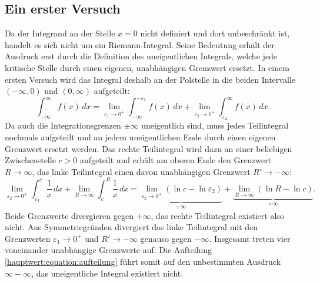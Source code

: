 \subsection{Ein erster Versuch}
Da der Integrand an der Stelle $x = 0$ nicht definiert und dort unbeschränkt
ist, handelt es sich nicht um ein Riemann-Integral.
Seine Bedeutung erhält der Ausdruck erst durch die Definition des
uneigentlichen Integrals, welche jede kritische Stelle durch einen eigenen,
unabhängigen Grenzwert ersetzt.
In einem ersten Versuch wird das Integral deshalb an der Polstelle in die
beiden Intervalle $(-\infty,0)$ und $(0,\infty)$ aufgeteilt:
\begin{equation}
\int_{-\infty}^{\infty} f(x)\,dx
= \lim_{\varepsilon_1\to 0^+} \int_{-\infty}^{-\varepsilon_1} f(x)\,dx
+ \lim_{\varepsilon_2\to 0^+} \int_{\varepsilon_2}^{\infty} f(x)\,dx.
\label{hauptwert:equation:aufteilung}
\end{equation}
Da auch die Integrationsgrenzen $\pm\infty$ uneigentlich sind,
muss jedes Teilintegral nochmals aufgeteilt
und an jedem uneigentlichen Ende durch einen eigenen Grenzwert ersetzt werden.
Das rechte Teilintegral wird dazu an einer beliebigen Zwischenstelle
$c > 0$ aufgeteilt und erhält am oberen Ende den Grenzwert $R \to \infty$,
das linke Teilintegral einen davon unabhängigen Grenzwert $R' \to -\infty$:
\begin{equation}
\lim_{\varepsilon_2\to 0^+} \int_{\varepsilon_2}^{c} \frac{1}{x}\,dx
+ \lim_{R\to\infty} \int_{c}^{R} \frac{1}{x}\,dx
= \underbrace{\lim_{\varepsilon_2\to 0^+} \left(\ln c - \ln \varepsilon_2\right)}_{+\infty}
+ \underbrace{\lim_{R\to\infty} \left(\ln R - \ln c\right)}_{+\infty}.
\label{hauptwert:equation:rechts}
\end{equation}
Beide Grenzwerte divergieren gegen $+\infty$,
das rechte Teilintegral existiert also nicht.
Aus Symmetriegründen divergiert das linke Teilintegral
mit den Grenzwerten $\varepsilon_1 \to 0^+$ und $R' \to -\infty$
genauso gegen $-\infty$.
Insgesamt treten vier voneinander unabhängige Grenzwerte auf.
Die Aufteilung \eqref{hauptwert:equation:aufteilung} führt somit auf den
unbestimmten Ausdruck $\infty - \infty$,
das uneigentliche Integral existiert nicht.

